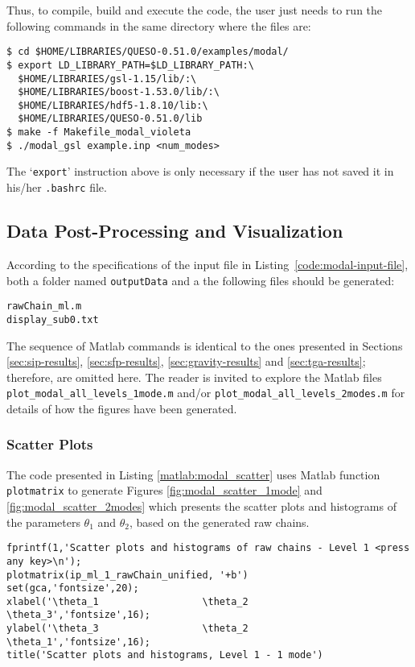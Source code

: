 Thus, to compile, build and execute the code, the user just needs to run the following commands in the same directory where the files are:
\begin{lstlisting}
$ cd $HOME/LIBRARIES/QUESO-0.51.0/examples/modal/
$ export LD_LIBRARY_PATH=$LD_LIBRARY_PATH:\
  $HOME/LIBRARIES/gsl-1.15/lib/:\
  $HOME/LIBRARIES/boost-1.53.0/lib/:\
  $HOME/LIBRARIES/hdf5-1.8.10/lib:\
  $HOME/LIBRARIES/QUESO-0.51.0/lib 
$ make -f Makefile_modal_violeta 
$ ./modal_gsl example.inp <num_modes>
\end{lstlisting}

The `\verb+export+' instruction above is only necessary if the user has not saved it in his/her \verb+.bashrc+ file. 


\subsection{Data Post-Processing and Visualization}\label{sec:modal-results}



According to the specifications of the input file in Listing~\ref{code:modal-input-file}, both a folder named \verb+outputData+ and a the following files should be generated:
\begin{verbatim}
rawChain_ml.m 
display_sub0.txt    
\end{verbatim}


The sequence of Matlab commands is identical to the ones presented in Sections
\ref{sec:sip-results}, \ref{sec:sfp-results}, \ref{sec:gravity-results} and \ref{sec:tga-results};
therefore, are omitted here. The reader is invited to explore the Matlab files
\texttt{plot\_modal\_all\_levels\_1mode.m}  and/or \texttt{plot\_modal\_all\_levels\_2modes.m}  
for details of how the figures have been generated.


\subsubsection{Scatter Plots}

The code presented in Listing \ref{matlab:modal_scatter} uses Matlab function \verb+plotmatrix+ to generate Figures \ref{fig:modal_scatter_1mode} and \ref{fig:modal_scatter_2modes}
which presents the scatter plots and histograms of the parameters $\theta_1$ and $\theta_2$, based on the generated raw chains. 


\begin{lstlisting}[label=matlab:modal_scatter,caption={Matlab code for the scatter plots depicted in Figures \ref{fig:modal_scatter_1mode} and \ref{fig:modal_scatter_2modes}.}]
fprintf(1,'Scatter plots and histograms of raw chains - Level 1 <press any key>\n');
plotmatrix(ip_ml_1_rawChain_unified, '+b')
set(gca,'fontsize',20); 
xlabel('\theta_1                  \theta_2                   \theta_3','fontsize',16);
ylabel('\theta_3                  \theta_2                   \theta_1','fontsize',16);
title('Scatter plots and histograms, Level 1 - 1 mode')
\end{lstlisting}

